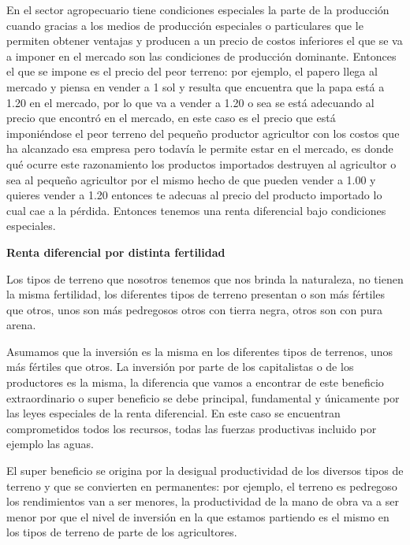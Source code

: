 \documentclass[
  a4paper,
]{article}
\begin{document}
En el sector agropecuario tiene condiciones especiales la parte de la
producción cuando gracias a los medios de producción especiales o
particulares que le permiten obtener ventajas y producen a un precio de
costos inferiores el que se va a imponer en el mercado son las
condiciones de producción dominante. Entonces el que se impone es el
precio del peor terreno: por ejemplo, el papero llega al mercado y
piensa en vender a 1 sol y resulta que encuentra que la papa está a 1.20
en el mercado, por lo que va a vender a 1.20 o sea se está adecuando al
precio que encontró en el mercado, en este caso es el precio que está
imponiéndose el peor terreno del pequeño productor agricultor con los
costos que ha alcanzado esa empresa pero todavía le permite estar en el
mercado, es donde qué ocurre este razonamiento los productos importados
destruyen al agricultor o sea al pequeño agricultor por el mismo hecho
de que pueden vender a 1.00 y quieres vender a 1.20 entonces te adecuas
al precio del producto importado lo cual cae a la pérdida. Entonces
tenemos una renta diferencial bajo condiciones especiales.

\textbf{Renta diferencial por distinta fertilidad}

Los tipos de terreno que nosotros tenemos que nos brinda la naturaleza,
no tienen la misma fertilidad, los diferentes tipos de terreno presentan
o son más fértiles que otros, unos son más pedregosos otros con tierra
negra, otros son con pura arena.

Asumamos que la inversión es la misma en los diferentes tipos de
terrenos, unos más fértiles que otros. La inversión por parte de los
capitalistas o de los productores es la misma, la diferencia que vamos a
encontrar de este beneficio extraordinario o super beneficio se debe
principal, fundamental y únicamente por las leyes especiales de la renta
diferencial. En este caso se encuentran comprometidos todos los
recursos, todas las fuerzas productivas incluido por ejemplo las aguas.

El super beneficio se origina por la desigual productividad de los
diversos tipos de terreno y que se convierten en permanentes: por
ejemplo, el terreno es pedregoso los rendimientos van a ser menores, la
productividad de la mano de obra va a ser menor por que el nivel de
inversión en la que estamos partiendo es el mismo en los tipos de
terreno de parte de los agricultores.
\end{document}

